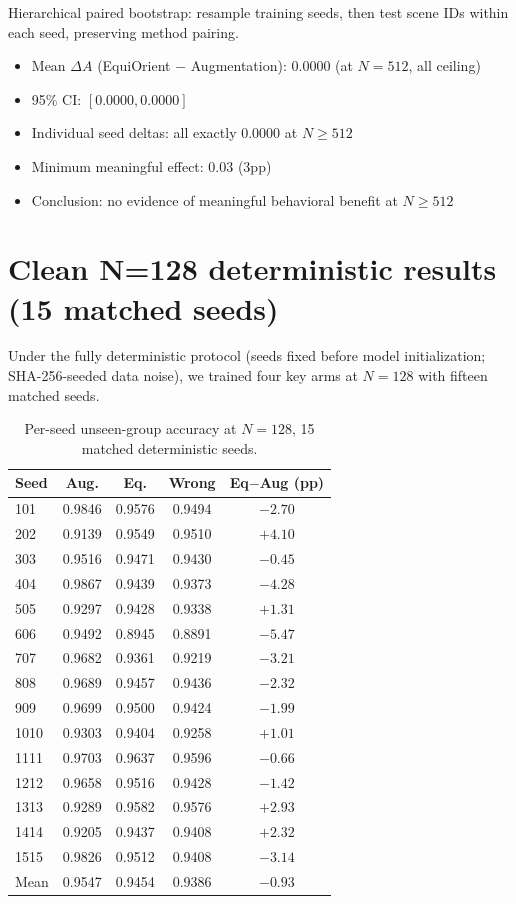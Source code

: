 \documentclass[10pt,letterpaper]{article}
\begin{document}
Hierarchical paired bootstrap: resample training seeds, then test
scene IDs within each seed, preserving method pairing.

\begin{itemize}[leftmargin=*]
\item Mean $\Delta A$ (EquiOrient $-$ Augmentation): $0.0000$ (at $N{=}512$, all ceiling)
\item 95\% CI: $[0.0000, 0.0000]$
\item Individual seed deltas: all exactly $0.0000$ at $N \geq 512$
\item Minimum meaningful effect: $0.03$ (3pp)
\item Conclusion: no evidence of meaningful behavioral benefit at $N \geq 512$
\end{itemize}

\section{Clean N=128 deterministic results (15 matched seeds)}

Under the fully deterministic protocol (seeds fixed before model
initialization; SHA-256-seeded data noise), we trained four key arms at
$N{=}128$ with fifteen matched seeds.

\begin{table}[h]
\centering\small
\begin{tabular}{lcccc}
\toprule
Seed & Aug. & Eq. & Wrong & Eq$-$Aug (pp) \\
\midrule
101 & 0.9846 & 0.9576 & 0.9494 & $-2.70$ \\
202 & 0.9139 & 0.9549 & 0.9510 & $+4.10$ \\
303 & 0.9516 & 0.9471 & 0.9430 & $-0.45$ \\
404 & 0.9867 & 0.9439 & 0.9373 & $-4.28$ \\
505 & 0.9297 & 0.9428 & 0.9338 & $+1.31$ \\
606 & 0.9492 & 0.8945 & 0.8891 & $-5.47$ \\
707 & 0.9682 & 0.9361 & 0.9219 & $-3.21$ \\
808 & 0.9689 & 0.9457 & 0.9436 & $-2.32$ \\
909 & 0.9699 & 0.9500 & 0.9424 & $-1.99$ \\
1010 & 0.9303 & 0.9404 & 0.9258 & $+1.01$ \\
1111 & 0.9703 & 0.9637 & 0.9596 & $-0.66$ \\
1212 & 0.9658 & 0.9516 & 0.9428 & $-1.42$ \\
1313 & 0.9289 & 0.9582 & 0.9576 & $+2.93$ \\
1414 & 0.9205 & 0.9437 & 0.9408 & $+2.32$ \\
1515 & 0.9826 & 0.9512 & 0.9408 & $-3.14$ \\
\midrule
Mean & 0.9547 & 0.9454 & 0.9386 & $-0.93$ \\
\bottomrule
\end{tabular}
\caption{Per-seed unseen-group accuracy at $N{=}128$, 15 matched
deterministic seeds.}
\end{table}
\end{document}
